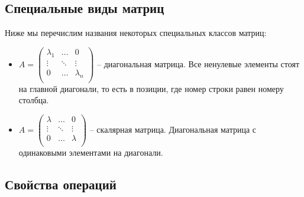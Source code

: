 \subsection{Специальные виды матриц}

Ниже мы перечислим названия некоторых специальных классов матриц:
\begin{itemize}
\item 
$A = 
\begin{pmatrix}
{\lambda_1}&{\ldots}&{0}\\
{\vdots}&{\ddots}&{\vdots}\\
{0}&{\ldots}&{\lambda_n}\\
\end{pmatrix}$ -- диагональная матрица.
Все ненулевые элементы стоят на главной диагонали, то есть в позиции, где номер строки равен номеру столбца.

\item
$A = 
\begin{pmatrix}
{\lambda}&{\ldots}&{0}\\
{\vdots}&{\ddots}&{\vdots}\\
{0}&{\ldots}&{\lambda}\\
\end{pmatrix}$ -- скалярная матрица.
Диагональная матрица с одинаковыми элементами на диагонали.
\end{itemize}

\subsection{Свойства операций}

